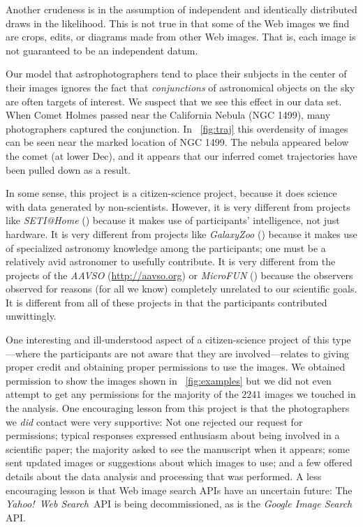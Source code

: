 \documentclass[12pt,preprint]{aastex}
\newcommand{\project}[1]{\textsl{#1}}
\newcommand{\yahoo}{Yahoo!}
\newcommand{\YWS}{\project{\yahoo\ Web Search}}
\newcommand{\figref}[1]{\figurename~\ref{#1}}
\begin{document}
Another crudeness is in the assumption of independent and identically
distributed draws in the likelihood.  This is not true in that some of
the Web images we find are crops, edits, or diagrams made from other
Web images.  That is, each image is not guaranteed to be an
independent datum.

Our model that astrophotographers tend to place their subjects in the
center of their images ignores the fact that \emph{conjunctions} of
astronomical objects on the sky are often targets of interest.  We
suspect that we see this effect in our data set.  When Comet Holmes
passed near the California Nebula (NGC 1499), many photographers
captured the conjunction.  In \figref{fig:traj} this overdensity of
images can be seen near the marked location of NGC 1499.  The nebula
appeared below the comet (at lower Dec), and it appears that our
inferred comet trajectories have been pulled down as a result.

In some sense, this project is a citizen-science project, because it
does science with data generated by non-scientists.  However, it is
very different from projects like \project{SETI@Home}
(\citealt{seti@home}) because it makes use of participants'
intelligence, not just hardware.  It is very different from projects
like \project{GalaxyZoo} (\citealt{galaxyzoo}) because it makes use of
specialized astronomy knowledge among the participants; one must be
a relatively avid astronomer to usefully contribute.  It is very
different from the projects of the \project{AAVSO} (\url{http://aavso.org})
or \project{MicroFUN} (\citealt{microfun}) because the observers
observed for reasons (for all we know) completely unrelated to our
scientific goals.  It is different from all of these projects in that
the participants contributed unwittingly.

One interesting and ill-understood aspect of a citizen-science project
of this type---where the participants are not aware that they are
involved---relates to giving proper credit and obtaining proper
permissions to use the images.  We obtained permission to show the
images shown in \figref{fig:examples} but we did not even attempt to
get any permissions for the majority of the $2241$ images we touched
in the analysis.  One encouraging lesson from this project is that the
photographers we \emph{did} contact were very supportive: Not one
rejected our request for permissions; typical responses expressed
enthusiasm about being involved in a scientific paper; the majority
asked to see the manuscript when it appears; some sent updated images
or suggestions about which images to use; and a few offered details
about the data analysis and processing that was performed.  A less
encouraging lesson is that Web image search APIs have an uncertain
future: The \YWS\ API is being decommissioned, as is the
\project{Google Image Search} API.
\end{document}
